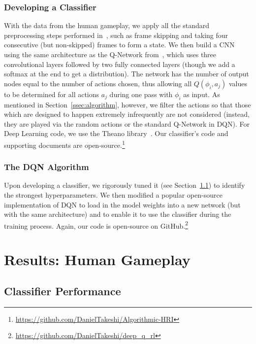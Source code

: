 \documentclass[letterpaper, 10pt, conference]{ieeeconf}
\begin{document}
\subsubsection{Developing a Classifier} With the data from the human gameplay,
we apply all the standard preprocessing steps performed in~\cite{mnih-dqn-2015},
such as frame skipping and taking four consecutive (but non-skipped) frames to
form a state. We then build a CNN using the same architecture as the Q-Network
from~\cite{mnih-dqn-2015}, which uses three convolutional layers followed by two
fully connected layers (though we add a softmax at the end to get a
distribution). The network has the number of output nodes equal to the number of
actions chosen, thus allowing all $Q(\phi_i,a_j)$ values to be determined for
all actions $a_j$ during one pass with $\phi_i$ as input.  As mentioned in
Section~\ref{ssec:algorithm}, however, we filter the actions so that those which
are designed to happen extremely infrequently are not considered (instead, they
are played via the random actions or the standard Q-Network in DQN). For Deep
Learning code, we use the Theano library~\cite{2016arXiv160502688short}.  Our
classifier's code and supporting documents are
open-source.\footnote{\url{https://github.com/DanielTakeshi/Algorithmic-HRI}}

\subsubsection{The DQN Algorithm} Upon developing a classifier, we rigorously
tuned it (see Section~\ref{ssec:results_classifier}) to identify the strongest
hyperparameters. We then modified a popular open-source implementation of DQN to
load in the model weights into a new network (but with the same architecture)
and to enable it to use the classifier during the training process. Again, our
code is open-source on
GitHub.\footnote{\url{https://github.com/DanielTakeshi/deep_q_rl}}



\section{Results: Human Gameplay}\label{sec:results_p1}

\subsection{Classifier Performance}\label{ssec:results_classifier}
\end{document}
